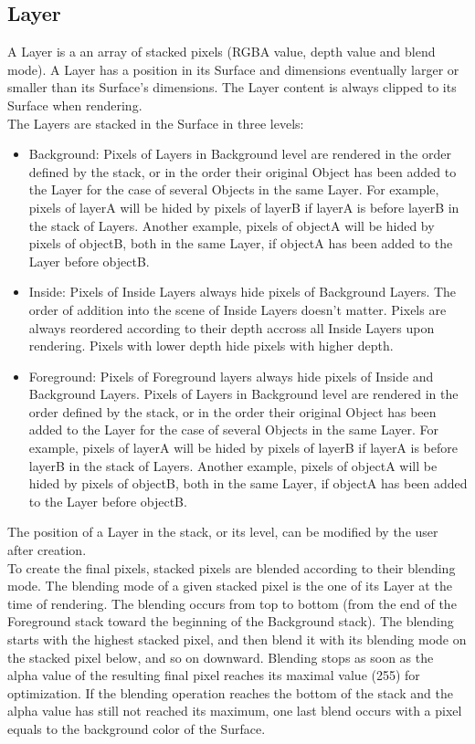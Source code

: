 \subsection{Layer}

A Layer is a an array of stacked pixels (RGBA value, depth value and blend mode). A Layer has a position in its Surface and dimensions eventually larger or smaller than its Surface's dimensions. The Layer content is always clipped to its Surface when rendering.\\

The Layers are stacked in the Surface in three levels:\\
\begin{itemize}
\item Background: Pixels of Layers in Background level are rendered in the order defined by the stack, or in the order their original Object has been added to the Layer for the case of several Objects in the same Layer. For example, pixels of layerA will be hided by pixels of layerB if layerA is before layerB in the stack of Layers. Another example, pixels of objectA will be hided by pixels of objectB, both in the same Layer, if objectA has been added to the Layer before objectB.
\item Inside: Pixels of Inside Layers always hide pixels of Background Layers. The order of addition into the scene of Inside Layers doesn't matter. Pixels are always reordered according to their depth accross all Inside Layers upon rendering. Pixels with lower depth hide pixels with higher depth.
\item Foreground: Pixels of Foreground layers always hide pixels of Inside and Background Layers. Pixels of Layers in Background level are rendered in the order defined by the stack, or in the order their original Object has been added to the Layer for the case of several Objects in the same Layer. For example, pixels of layerA will be hided by pixels of layerB if layerA is before layerB in the stack of Layers. Another example, pixels of objectA will be hided by pixels of objectB, both in the same Layer, if objectA has been added to the Layer before objectB.
\end{itemize}

The position of a Layer in the stack, or its level, can be modified by the user after creation.\\

To create the final pixels, stacked pixels are blended according to their blending mode. The blending mode of a given stacked pixel is the one of its Layer at the time of rendering. The blending occurs from top to bottom (from the end of the Foreground stack toward the beginning of the Background stack). The blending starts with the highest stacked pixel, and then blend it with its blending mode on the stacked pixel below, and so on downward. Blending stops as soon as the alpha value of the resulting final pixel reaches its maximal value (255) for optimization. If the blending operation reaches the bottom of the stack and the alpha value has still not reached its maximum, one last blend occurs with a pixel equals to the background color of the Surface.\\

